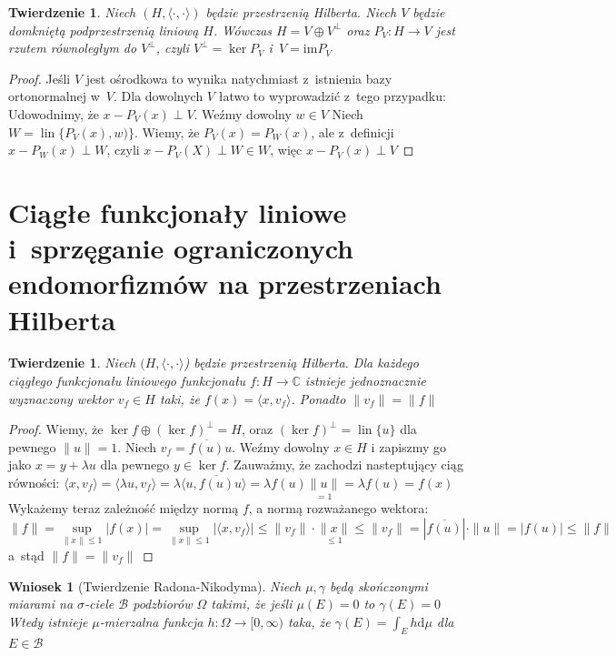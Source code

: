\documentclass[11pt]{mwrep}
\renewcommand{\[}{\begin{equation}}
\renewcommand{\]}{\end{equation}}
\newcommand{\C}{{\ensuremath{\mathbb C}}}
\newcommand{\lin}{\operatorname{lin}}
\newcommand{\dd}{\mathrm{d}}
\newcommand{\scal}{\langle \cdot,\cdot \rangle}
\newcommand{\im}{\mathrm{im}}
\newtheorem{twr}[subsection]{Twierdzenie}%
\newtheorem{wn}[subsection]{Wniosek}
\begin{document}
\begin{twr}
	Niech $(H,\scal)$ będzie przestrzenią Hilberta. Niech $V$ będzie domkniętą podprzestrzenią liniową $H$.
	Wówczas $H = V\oplus V^\perp$ oraz $P_V \colon H \to V$  jest rzutem równoległym do $V^\perp$, czyli $V^\perp = \ker P_V$ i~$V = \im P_V$
\end{twr}
\begin{proof}
	Jeśli $V$ jest ośrodkowa to wynika natychmiast z~istnienia bazy ortonormalnej w~$V$.
	Dla dowolnych $V$ łatwo to wyprowadzić z~tego przypadku:\\
	Udowodnimy, że $x-P_V(x) \perp V$. Weźmy dowolny $w \in V$ 
	Niech $W= \lin\{P_V(x),w)\}$. Wiemy, że $P_V(x) = P_W(x)$, ale  z~definicji $x- P_W(x)  \perp W$, czyli $x-P_V(X) \perp W\in W$, więc $x - P_V(x) \perp V$ 
\end{proof}
\section{Ciągłe funkcjonały liniowe i~sprzęganie ograniczonych endomorfizmów na przestrzeniach Hilberta}
\begin{twr}
	\label{tw241}
	Niech $(H, \scal $) będzie przestrzenią Hilberta. Dla każdego ciągłego funkcjonału liniowego funkcjonału $f\colon H \to \C$
	istnieje jednoznacznie wyznaczony wektor $v_f \in H$ taki, że $f(x) = \langle x,v_f \rangle$. Ponadto $\|v_f\| = \|f\|$ 
\end{twr}
\begin{proof}
	Wiemy, że $\ker f \oplus (\ker f)^\perp  =H$, oraz $(\ker f)^\perp = \lin\{u\}$ dla pewnego $\|u\|=1$.
	Niech $v_f = \overline{f(u)} u$.
	Weźmy dowolny $x\in H$ i zapiszmy go jako $x= y+\lambda u$  dla pewnego $y\in \ker f$. Zauważmy, że zachodzi nasteptujący ciąg równości: $\langle x, v_f  \rangle = \langle \lambda u , v_f \rangle = \lambda\langle u, \overline{f(u)} u  \rangle = \lambda f(u) \underset{=1}{\|u\|} = \lambda f(u)=f(x)$\\
	Wykażemy teraz zależność między normą $f$, a normą rozważanego wektora:
	$$\|f\| = \sup_{\|x\|\le 1} |f(x)| = \sup_{\|x\|\le 1} |\langle x,v_f \rangle| \le \|v_f\|\cdot \underset{\le 1}{\|x\|} \le \|v_f\| = 
	|\overline{f(u)}|\cdot \|u\| = |f(u)| \le \|f\|$$
	a~stąd $\|f\| = \|v_f\|$

\end{proof}
\begin{wn}[Twierdzenie Radona-Nikodyma]
	Niech $\mu, \gamma$ będą skończonymi  miarami na $\sigma$-ciele $\mathcal{B}$ podzbiorów $\Omega$ takimi, że jeśli $\mu(E) = 0$ to $\gamma(E) = 0$
	Wtedy istnieje $\mu$-mierzalna funkcja $h\colon \Omega\to [0,\infty)$ taka, że $\gamma(E) = \int_E h \dd \mu$ dla $E\in \mathcal{B}$ 
\end{wn}
\end{document}
